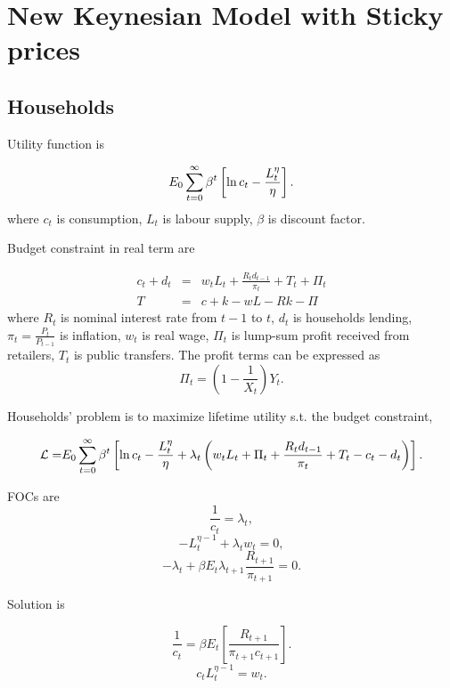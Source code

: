 \documentclass{article}
\begin{document}
\section{New Keynesian Model with Sticky prices}

\subsection{Households}

Utility function is

\begin{equation}
E_{0}\sum_{t=0}^{\infty }\beta ^{t}\left[ \ln c_{t}-\frac{L_{t}^{\eta }}{%
\eta }\right] .  \label{Utility function}
\end{equation}%
where $c_{t}$ is consumption, $L_{t}$ is labour supply, $\beta $ is discount
factor.

Budget constraint in real term are

\begin{eqnarray}
c_{t}+d_{t} &=&w_{t}L_{t}+\frac{R_{t}d_{t-1}}{\pi _{t}}+T_{t}+\Pi _{t}
\label{Intertemporal constraint} \\
T &=&c+k-wL-Rk-\Pi
\end{eqnarray}%
where $R_{t}$ is nominal interest rate from $t-1$ to $t$, $d_{t}$ is
households lending, $\pi _{t}=\frac{P_{t}}{P_{t-1}}$ is inflation, $w_{t}$
is real wage, $\Pi _{t}$ is lump-sum profit received from retailers, $T_{t}$
is public transfers. The profit terms can be expressed as%
\[
\Pi _{t}=\left( 1-\frac{1}{X_{t}}\right) Y_{t}. 
\]

Households' problem is to maximize lifetime utility s.t. the budget
constraint,

\[
\mathcal{L=}E_{0}\sum_{t=0}^{\infty }\beta ^{t}\left[ \ln c_{t}-\frac{%
L_{t}^{\eta }}{\eta }+\lambda _{t}\left( w_{t}L_{t}+\Pi _{t}+\frac{%
R_{t}d_{t-1}}{\pi _{t}}+T_{t}-c_{t}-d_{t}\right) \right] . 
\]

FOCs are%
\[
\frac{1}{c_{t}}=\lambda _{t}, 
\]%
\[
-L_{t}^{\eta -1}+\lambda _{t}w_{t}=0, 
\]%
\[
-\lambda _{t}+\beta E_{t}\lambda _{t+1}\frac{R_{t+1}}{\pi _{t+1}}=0. 
\]

Solution is

\begin{equation}
\frac{1}{c_{t}}=\beta E_{t}\left[ \frac{R_{t+1}}{\pi _{t+1}c_{t+1}}\right] .
\label{Euler equation}
\end{equation}%
\begin{equation}
c_{t}L_{t}^{\eta -1}=w_{t}.  \label{Labour supply}
\end{equation}
\end{document}
